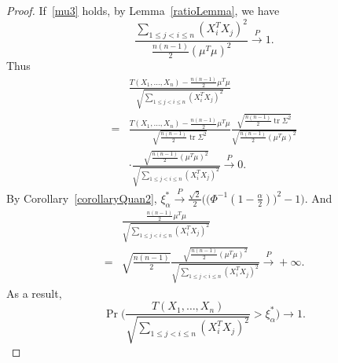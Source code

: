 \documentclass[review]{elsarticle}
\DeclareMathOperator{\mytr}{tr}
\theoremstyle{plain}
\theoremstyle{definition}
\theoremstyle{remark}
\begin{document}
\begin{proof}
    If~\eqref{mu3} holds, by Lemma~\ref{ratioLemma}, we have
    \begin{equation*}
    \frac{\sum_{1\leq j< i\leq n}(X_i^T X_j)^2}{\frac{n(n-1)}{2}{(\mu^T\mu)}^2}\xrightarrow{P}1.
    \end{equation*}
    Thus
    \begin{equation*}
        \begin{aligned}
            &\frac{T( X_1,\ldots, X_n)-\frac{n(n-1)}{2}\mu^T\mu}{\sqrt{\sum_{1\leq j<i\leq n}{(X_i^T X_j)}^2}}        \\
            =&\frac{T( X_1,\ldots, X_n)-\frac{n(n-1)}{2}\mu^T\mu}{\sqrt{\frac{n(n-1)}{2}\mytr \Sigma^2}}
            \frac{\sqrt{\frac{n(n-1)}{2}\mytr \Sigma^2}}{\sqrt{\frac{n(n-1)}{2}{(\mu^T \mu)}^2}}        \\
            &\cdot
            \frac{\sqrt{\frac{n(n-1)}{2}{(\mu^T \mu)}^2}}{\sqrt{\sum_{1\leq j<i\leq n}{(X_i^T X_j)}^2}}        
            \xrightarrow{P} 0.
        \end{aligned}
    \end{equation*}
    By Corollary~\ref{corollaryQuan2}, $\xi_{\alpha}^*\xrightarrow{P}\frac{\sqrt{2}}{2}\Big(\big(\Phi^{-1}(1-\frac{\alpha}{2})\big)^2-1\Big)$. And 
    \begin{equation*}
        \begin{aligned}
            &\frac{\frac{n(n-1)}{2}\mu^T\mu}{\sqrt{\sum_{1\leq j<i\leq n}{(X_i^T X_j)}^2}}\\
            =&
    \sqrt{\frac{n(n-1)}{2}}\frac{\sqrt{\frac{n(n-1)}{2}(\mu^T\mu)^2}}{\sqrt{\sum_{1\leq j<i\leq n}{(X_i^T X_j)}^2}}
    \xrightarrow{P}+\infty.
        \end{aligned}
    \end{equation*}
    As a result,
    \begin{equation*}
        \Pr\Big(\frac{T( X_1,\ldots, X_n)}{\sqrt{\sum_{1\leq j<i\leq n}{(X_i^T X_j)}^2}}>\xi_{\alpha}^* \Big)
    \to 1.
    \end{equation*}


\end{proof}
\end{document}
